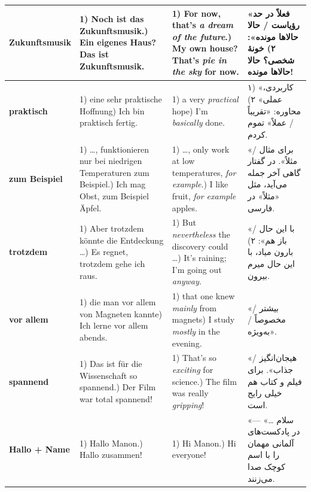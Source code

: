 \documentclass[10pt]{article}
\newcommand{\w}[1]{\textbf{#1}}
\newcounter{wn}
\begin{document}
\begin{longtable}{|L{3.4cm}|L{8.6cm}|L{6.6cm}|F{6.3cm}|}
\w{Zukunftsmusik} &
1) Noch ist das Zukunftsmusik.) Ein eigenes Haus? Das ist Zukunftsmusik. &
1) For now, that’s \emph{a dream of the future}.) My own house? That’s \emph{pie in the sky} for now. &
«فعلاً در حد رؤیاست / حالا حالاها مونده»:\newline
۲) خونهٔ شخصی؟ حالا حالاها مونده! \\\hline

\w{praktisch} &
1) eine sehr praktische Hoffnung) Ich bin praktisch fertig. &
1) a very \emph{practical} hope) I’m \emph{basically} done. &
۱) «کاربردی، عملی»\newline
۲) محاوره: «تقریباً / عملاً» تموم کردم. \\\hline

\w{zum Beispiel} &
1) …, funktionieren nur bei niedrigen Temperaturen zum Beispiel.) Ich mag Obst, zum Beispiel Äpfel. &
1) …, only work at low temperatures, \emph{for example}.) I like fruit, \emph{for example} apples. &
«برای مثال / مثلاً». در گفتار گاهی آخر جمله می‌آید، مثل «مثلاً» در فارسی. \\\hline

\w{trotzdem} &
1) Aber trotzdem könnte die Entdeckung …) Es regnet, trotzdem gehe ich raus. &
1) But \emph{nevertheless} the discovery could …) It’s raining; I’m going out \emph{anyway}. &
«با این حال / باز هم»:\newline
۲) بارون میاد، با این حال میرم بیرون. \\\hline

\w{vor allem} &
1) die man vor allem von Magneten kannte) Ich lerne vor allem abends. &
1) that one knew \emph{mainly} from magnets) I study \emph{mostly} in the evening. &
«بیشتر / مخصوصاً / به‌ویژه». \\\hline

\w{spannend} &
1) Das ist für die Wissenschaft so spannend.) Der Film war total spannend! &
1) That’s so \emph{exciting} for science.) The film was really \emph{gripping}! &
«هیجان‌انگیز / جذاب». برای فیلم و کتاب هم خیلی رایج است. \\\hline

\w{Hallo + Name} &
1) Hallo Manon.) Hallo zusammen! &
1) Hi Manon.) Hi everyone! &
«سلام …» — در پادکست‌های آلمانی مهمان را با اسم کوچک صدا می‌زنند. \\\hline
\end{longtable}
\end{document}
